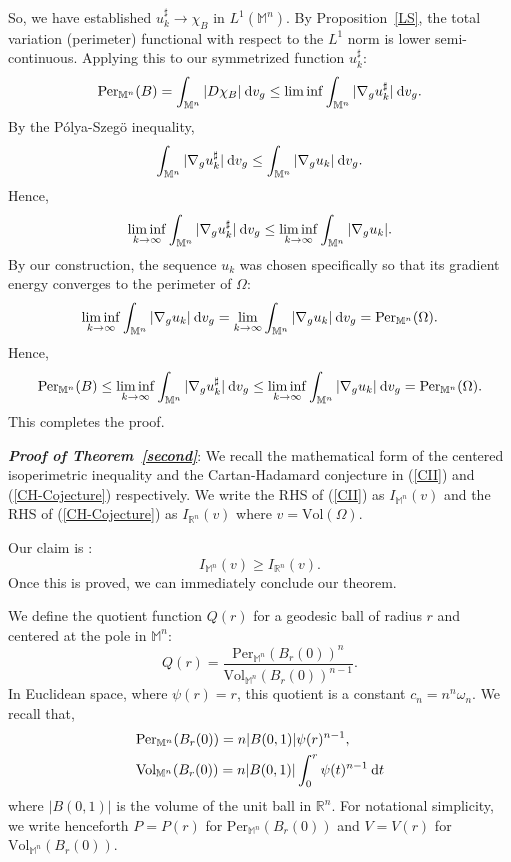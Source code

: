 \documentclass[a4paper,11pt,reqno]{amsart}
\renewcommand\eqref[1]{(\ref{#1})}
\theoremstyle{plain}
\numberwithin{equation}{section} \allowdisplaybreaks
\newcommand{\dvg}{\: {\rm d}v_{g}}
\newcommand{\gradg}{\nabla_g}
\newcommand{\m}{\mathbb{M}^n}
\newcommand{\dt}{\:{\rm d}t}
\newcommand{\rn}{\mathbb{R}^n}
\newcommand{\uv}{\omega_n}
\begin{document}
So, we have established $u_k^\sharp \to \chi_B$ in $L^1(\m)$. By Proposition~\ref{LS}, the total variation (perimeter) functional with respect to the $L^1$ norm is lower semi-continuous. Applying this to our symmetrized function $u_k^{\sharp}$:
\begin{equation*}
    \text{Per}_{\m}(B) =\int_{\m} |D\chi_{B}|\dvg\leq \liminf \int_{\m} |\gradg u_k^\sharp|\dvg.
\end{equation*} 
By the P\'olya-Szeg\"o inequality,
\begin{equation*}
    \int_{\m}|\gradg u_k^\sharp|\dvg \leq \int_{\m} |\gradg u_k|\dvg.
\end{equation*}
Hence,
\begin{equation*}
    \liminf_{k \to \infty} \int_{\m} |\gradg u_k^\sharp|\dvg \leq \liminf_{k \to \infty} \int_{\m} |\gradg u_k|.
\end{equation*}
By our construction, the sequence $u_k$ was chosen specifically so that its gradient energy converges  to the perimeter of $\Omega$:
\begin{equation*}
    \liminf_{k \to \infty} \int_{\m}|\gradg u_k|\dvg =\lim_{k \to \infty} \int_{\m} |\gradg u_k|\dvg= \text{Per}_{\m}(\Omega).
\end{equation*}
Hence,
\begin{equation*}
    \text{Per}_{\m}(B) \leq \liminf_{k \to \infty}\int_{\m}|\gradg u_k^\sharp|\dvg\leq \liminf_{k \to \infty}\int_{\m} |\gradg u_k|\dvg=\text{Per}_{\m}(\Omega).
\end{equation*}
This completes the proof.


\medskip

\textit{\textbf{Proof of Theorem~\ref{second}}}: We recall the mathematical form of the centered isoperimetric inequality and the Cartan-Hadamard conjecture in \eqref{CII} and \eqref{CH-Cojecture} respectively. We write the RHS of \eqref{CII} as $I_{\m}(v)$ and the RHS of \eqref{CH-Cojecture} as $I_{\rn}(v)$ where $v=\text{Vol}(\Omega)$.\par Our claim is :
\begin{equation}\label{pm>pe}
    I_{\m}(v) \geq I_{\rn}(v).
\end{equation}
Once this is proved, we can immediately conclude our theorem.

We define the quotient function $Q(r)$ for a geodesic ball of radius $r$ and centered at the pole in $\m$:
\begin{equation*}
    Q(r)=\frac{\text{Per}_{\m}(B_r(0))^n}{\text{Vol}_{\m}(B_r(0))^{n-1}}.
\end{equation*}
In Euclidean space, where $\psi(r)=r$, this quotient is a constant $c_n=n^n\uv$. We recall that,
\begin{align*}
    &\text{Per}_{\m}(B_r(0))= n|B(0,1)| \psi(r)^{n-1},\\
    &\text{Vol}_{\m}(B_r(0))= n|B(0,1)|\int_0^r\psi(t)^{n-1}\dt
\end{align*}
where $|B(0,1)|$ is the volume of the unit ball in $\rn$. For notational simplicity, we write henceforth $P=P(r)$ for $\text{Per}_{\m}(B_r(0))$ and $V=V(r)$ for $\text{Vol}_{\m}(B_r(0))$.
\end{document}
